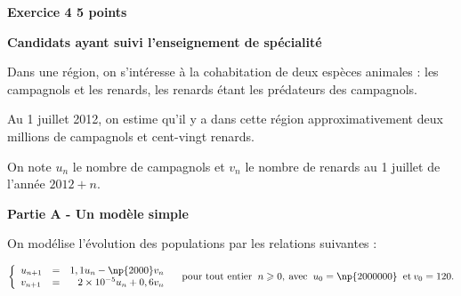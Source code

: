 \documentclass[10pt,a4paper]{article}
\begin{document}
\vspace{0,5cm}

\textbf{Exercice 4 \hfill  5 points}

\textbf{Candidats ayant suivi l'enseignement de spécialité}

\medskip

Dans une région, on s'intéresse à la cohabitation de deux espèces animales : les campagnols et les
renards, les renards étant les prédateurs des campagnols. 

Au 1 juillet 2012, on estime qu'il y a dans cette région approximativement deux millions de campagnols et cent-vingt renards.

On note $u_n$ le nombre de campagnols et $v_n$ le nombre de renards au 1 juillet de l'année $2012+ n$.

\bigskip

\textbf{Partie A - Un modèle simple}

\medskip

On modélise l'évolution des populations par les relations suivantes :

\[\left\{\begin{array}{l c r}
u_{n+1}& =& 1,1u_n - \np{2000}v_n\\
v_{n+1} &=& 2 \times 10^{-5}u_n + 0,6v_n
\end{array}\right. \quad \text{pour tout entier }\:n \geqslant 0,\: \text{avec } \:u_0 = \np{2000000}\:  \text{ et} \: v_0 = 120.\]

\medskip
\end{document}
